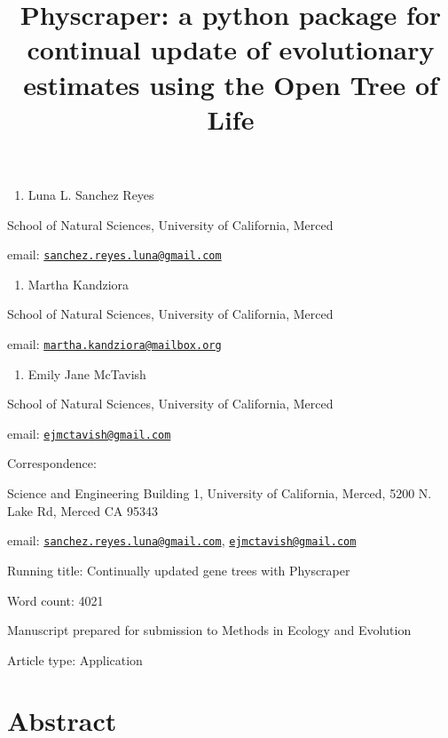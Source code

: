 \documentclass[]{article}
\title{Physcraper: a python package for continual update of evolutionary estimates using the Open Tree of Life}
\author{}
\date{\vspace{-2.5em}}
\providecommand{\tightlist}{%
  \setlength{\itemsep}{0pt}\setlength{\parskip}{0pt}}
\begin{document}
\maketitle

\begin{enumerate}
\def\labelenumi{\arabic{enumi}.}
\tightlist
\item
  Luna L. Sanchez Reyes
\end{enumerate}

School of Natural Sciences, University of California, Merced

email: \href{mailto:sanchez.reyes.luna@gmail.com}{\nolinkurl{sanchez.reyes.luna@gmail.com}}

\begin{enumerate}
\def\labelenumi{\arabic{enumi}.}
\setcounter{enumi}{1}
\tightlist
\item
  Martha Kandziora
\end{enumerate}

School of Natural Sciences, University of California, Merced

email: \href{mailto:martha.kandziora@mailbox.org}{\nolinkurl{martha.kandziora@mailbox.org}}

\begin{enumerate}
\def\labelenumi{\arabic{enumi}.}
\setcounter{enumi}{2}
\tightlist
\item
  Emily Jane McTavish
\end{enumerate}

School of Natural Sciences, University of California, Merced

email: \href{mailto:ejmctavish@gmail.com}{\nolinkurl{ejmctavish@gmail.com}}

Correspondence:

Science and Engineering Building 1, University of California, Merced, 5200 N. Lake Rd, Merced CA 95343

email: \href{mailto:sanchez.reyes.luna@gmail.com}{\nolinkurl{sanchez.reyes.luna@gmail.com}}, \href{mailto:ejmctavish@gmail.com}{\nolinkurl{ejmctavish@gmail.com}}

Running title: Continually updated gene trees with Physcraper

Word count: 4021

Manuscript prepared for submission to Methods in Ecology and Evolution

Article type: Application

\newpage

\hypertarget{abstract}{%
\section{Abstract}\label{abstract}}
\end{document}
